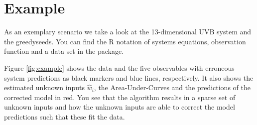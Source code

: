 \section{Example}
As an exemplary scenario we take a look at the 13-dimensional UVB system and the 
\textsf{greedyseeds}. You can find the R notation of systems equations, observation function 
and a data set in the package. 

Figure \ref{fig:example} shows the data and the five observables with erroneous system
predictions as black markers and blue lines, respectively. It also shows the estimated unknown 
inputs $\hat{w}_i$, the Area-Under-Curves and the predictions of the corrected model in red.
You see that the algorithm results in a sparse set of unknown inputs and how the unknown 
inputs are able to correct the model predictions such that these fit the data.